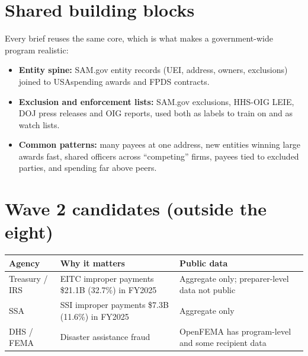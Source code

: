 \documentclass[letterpaper,11pt]{article}
\providecommand{\tightlist}{\setlength{\itemsep}{0pt}\setlength{\parskip}{0pt}}
\begin{document}
\hypertarget{shared-building-blocks}{%
\section{Shared building blocks}\label{shared-building-blocks}}

Every brief reuses the same core, which is what makes a government-wide
program realistic:

\begin{itemize}
\tightlist
\item
  \textbf{Entity spine:} SAM.gov entity records (UEI, address, owners,
  exclusions) joined to USAspending awards and FPDS contracts.
\item
  \textbf{Exclusion and enforcement lists:} SAM.gov exclusions, HHS-OIG
  LEIE, DOJ press releases and OIG reports, used both as labels to train
  on and as watch lists.
\item
  \textbf{Common patterns:} many payees at one address, new entities
  winning large awards fast, shared officers across ``competing'' firms,
  payees tied to excluded parties, and spending far above peers.
\end{itemize}

\hypertarget{wave-2-candidates-outside-the-eight}{%
\section{Wave 2 candidates (outside the
eight)}\label{wave-2-candidates-outside-the-eight}}

\begingroup\small\setlength{\tabcolsep}{4pt}\renewcommand{\arraystretch}{1.25}
\begin{longtable}[l]{@{}>{\raggedright\arraybackslash}p{}>{\raggedright\arraybackslash}p{}>{\raggedright\arraybackslash}p{}@{}}
\rowcolor{coolblack}\leavevmode\color{white}\bfseries Agency & \leavevmode\color{white}\bfseries Why it matters & \leavevmode\color{white}\bfseries Public data \\
\endhead
Treasury / IRS & EITC improper payments \$21.1B (32.7\%) in FY2025 & Aggregate only; preparer-level data not public \\
SSA & SSI improper payments \$7.3B (11.6\%) in FY2025 & Aggregate only \\
DHS / FEMA & Disaster assistance fraud & OpenFEMA has program-level and some recipient data \\
\end{longtable}\endgroup
\end{document}

